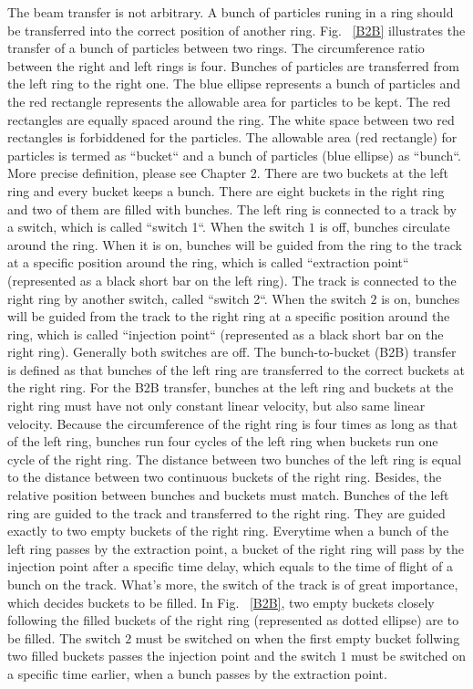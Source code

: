 The beam transfer is not arbitrary. A bunch of particles runing in a ring should be transferred into the correct position of another ring. Fig. ~\ref{B2B} illustrates the transfer of a bunch of particles between two rings. The circumference ratio between the right and left rings is four. Bunches of particles are transferred from the left ring to the right one. The blue ellipse represents a bunch of particles and the red rectangle represents the allowable area for particles to be kept. The red rectangles are equally spaced around the ring. The white space between two red rectangles is forbiddened for the particles. The allowable area (red rectangle) for particles is termed as ``bucket`` and a bunch of particles (blue ellipse) as ``bunch``. More precise definition, please see Chapter 2. There are two buckets at the left ring and every bucket keeps a bunch. There are eight buckets in the right ring and two of them are filled with bunches. The left ring is connected to a track by a switch, which is called ``switch 1``. When the switch $1$ is off, bunches circulate around the ring. When it is on, bunches will be guided from the ring to the track at a specific position around the ring, which is called ``extraction point`` (represented as a black short bar on the left ring). The track is connected to the right ring by another switch, called ``switch 2``. When the switch $2$ is on, bunches will be guided from the track to the right ring at a specific position around the ring, which is called ``injection point`` (represented as a black short bar on the right ring). Generally both switches are off. The bunch-to-bucket (B2B) transfer is defined as that bunches of the left ring are transferred to the correct buckets at the right ring. For the B2B transfer, bunches at the left ring and buckets at the right ring must have not only constant linear velocity, but also same linear velocity. Because the circumference of the right ring is four times as long as that of the left ring, bunches run four cycles of the left ring when buckets run one cycle of the right ring. The distance between two bunches of the left ring is equal to the distance between two continuous buckets of the right ring. Besides, the relative position between bunches and buckets must match. Bunches of the left ring are guided to the track and transferred to the right ring. They are guided exactly to two empty buckets of the right ring. Everytime when a bunch of the left ring passes by the extraction point, a bucket of the right ring will pass by the injection point after a specific time delay, which equals to the time of flight of a bunch on the track. What's more, the switch of the track is of great importance, which decides buckets to be filled. In Fig. ~\ref{B2B}, two empty buckets closely following the filled buckets of the right ring (represented as dotted ellipse) are to be filled. The switch $2$ must be switched on when the first empty bucket follwing two filled buckets passes the injection point and the switch $1$ must be switched on a specific time earlier, when a bunch passes by the extraction point. 

